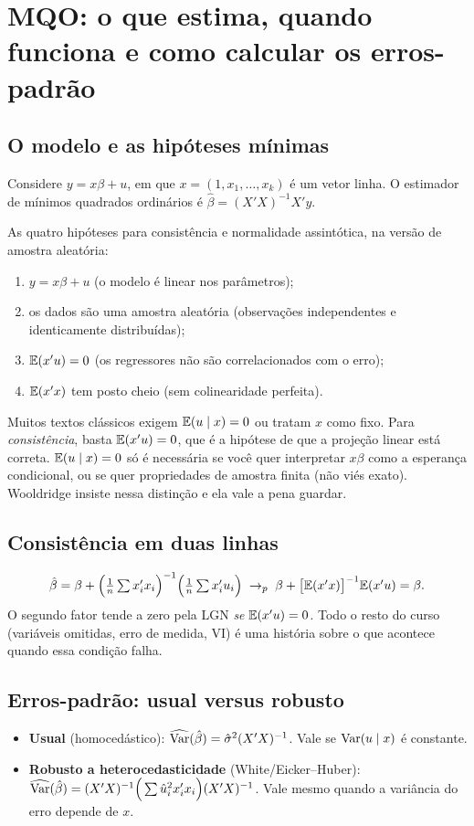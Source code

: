 \chapter{MQO: o que estima, quando funciona e como calcular os erros-padrão}
\label{cap:mqo}

\section{O modelo e as hipóteses mínimas}
Considere $y=x\beta+u$, em que $x=(1,x_1,\dots,x_k)$ é um vetor linha. O estimador de mínimos quadrados ordinários é $\hat\beta=(X'X)^{-1}X'y$.

As quatro hipóteses para consistência e normalidade assintótica, na versão de amostra aleatória:
\begin{enumerate}[leftmargin=1.6em]
\item $y=x\beta+u$ (o modelo é linear nos parâmetros);
\item os dados são uma amostra aleatória (observações independentes e identicamente distribuídas);
\item $\mathbb{E}(x'u)=0$ (os regressores não são correlacionados com o erro);
\item $\mathbb{E}(x'x)$ tem posto cheio (sem colinearidade perfeita).
\end{enumerate}

\begin{atencao}
Muitos textos clássicos exigem $\mathbb{E}(u\mid x)=0$ ou tratam $x$ como fixo. Para \emph{consistência}, basta $\mathbb{E}(x'u)=0$, que é a hipótese de que a projeção linear está correta. $\mathbb{E}(u\mid x)=0$ só é necessária se você quer interpretar $x\beta$ como a esperança condicional, ou se quer propriedades de amostra finita (não viés exato). Wooldridge insiste nessa distinção e ela vale a pena guardar.
\end{atencao}

\section{Consistência em duas linhas}
\[
\hat\beta=\beta+\Big(\tfrac1n\textstyle\sum x_i'x_i\Big)^{-1}\Big(\tfrac1n\sum x_i'u_i\Big)\;\to_p\;\beta+\big[\mathbb{E}(x'x)\big]^{-1}\mathbb{E}(x'u)=\beta.
\]
O segundo fator tende a zero pela LGN \emph{se} $\mathbb{E}(x'u)=0$. Todo o resto do curso (variáveis omitidas, erro de medida, VI) é uma história sobre o que acontece quando essa condição falha.

\section{Erros-padrão: usual versus robusto}
\begin{itemize}[leftmargin=1.4em]
\item \textbf{Usual} (homocedástico): $\widehat{\operatorname{Var}}(\hat\beta)=\hat\sigma^2(X'X)^{-1}$. Vale se $\operatorname{Var}(u\mid x)$ é constante.
\item \textbf{Robusto a heterocedasticidade} (White/Eicker--Huber): $\widehat{\operatorname{Var}}(\hat\beta)=(X'X)^{-1}\Big(\sum\hat u_i^2x_i'x_i\Big)(X'X)^{-1}$. Vale mesmo quando a variância do erro depende de $x$.
\end{itemize}

